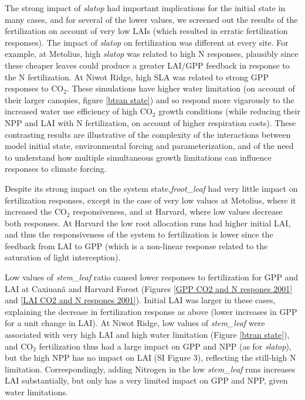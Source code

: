 \usepackage{}\documentclass[draft,linenumbers]{agujournal}
\begin{document}
The strong impact of \emph{slatop} had important implications for the initial state in many cases, and for several of the lower values, we screened out the results of the fertilization on account of very low LAIs (which resulted in erratic fertilization responses). The impact of \emph{slatop} on fertilization was different at every site. For example, at Metolius, high  \emph{slatop} was related to high N responses, plausibly since these cheaper leaves could produce a greater LAI/GPP feedback in response to the N fertilization. At Niwot Ridge, high SLA was related to strong GPP responses to CO$_{2}$. These simulations have higher water limitation (on account of their larger canopies, figure \ref{btran state}) and so respond more vigarously to the increased water use efficiency of high CO$_{2}$ growth conditions (while reducing their NPP and LAI with N fertilization, on account of higher respiration costs). These contrasting results are illustrative of the complexity of the interactions between model initial state, environmental forcing and parameterization, and of the need to understand how multiple simultaneous growth limitations can influence responses to climate forcing.   

Despite its strong impact on the system state,\emph{froot\_leaf} had very little impact on fertilization responses, except in the case of very low values at Metolius, where it increased the CO$_{2}$ responsiveness, and at Harvard, where low values decrease both responses. At Harvard the low root allocation runs had higher initial LAI, and thus the responsiveness of the system to fertilization is lower since the feedback from LAI to GPP (which is a non-linear response related to the saturation of light interception). 

Low values of \emph{stem\_leaf} ratio caused lower responses to fertilization for GPP and LAI at Caxiuan\~a and Harvard Forest (Figures \ref{GPP CO2 and N respones 2001} and \ref{LAI CO2 and N respones 2001}). Initial LAI was larger in these cases, explaining the decrease in fertilization response as above (lower increases in GPP for a unit change in LAI).  At Niwot Ridge, low values of \emph{stem\_leaf} were associated with very high LAI and high water limitation (Figure \ref{btran state}), and CO$_{2}$ fertilization thus had a large impact on GPP and NPP (as for \emph{slatop}), but the high NPP has no impact on LAI (SI Figure 3), reflecting the still-high N limitation.  Correspondingly, adding Nitrogen in the low \emph{stem\_leaf} runs increases LAI substantially, but only has a very limited impact on GPP and NPP, given water limitations.
\end{document}
